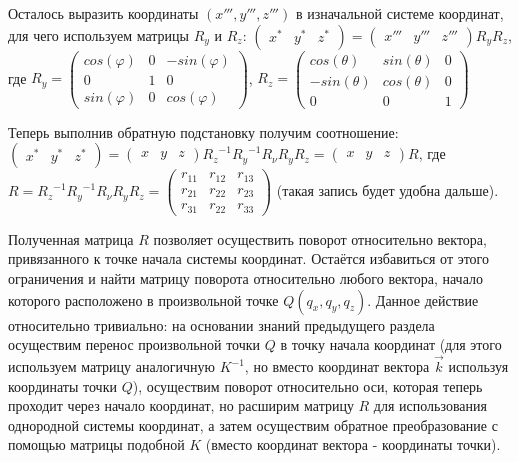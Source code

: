 \documentclass [12pt, a4paper] {article}
\begin{document}
Осталось выразить координаты $(x''', y''', z''')$ в изначальной системе координат, для чего используем матрицы $R_y$ и $R_z$:
$\begin {pmatrix} x^* & y^* & z^* \end {pmatrix} = \begin {pmatrix} x''' & y''' & z''' \end {pmatrix} R_y R_z$, где $R_y = \begin {pmatrix}
	cos(\varphi) & 0 & -sin(\varphi) \\
	0 & 1 & 0 \\
	sin(\varphi) & 0 & cos(\varphi)
\end {pmatrix}$, $R_z = \begin {pmatrix}
	cos(\theta) & sin(\theta) & 0 \\
	-sin(\theta) & cos(\theta) & 0 \\
	0 & 0 & 1
\end {pmatrix}$

Теперь выполнив обратную подстановку получим соотношение:
$\begin {pmatrix} x^* & y^* & z^* \end {pmatrix} = \begin {pmatrix} x & y & z \end {pmatrix} {R_z}^{-1} {R_y}^{-1} R_\nu R_y R_z = \begin {pmatrix} x & y & z\end {pmatrix} R$, где $R = {R_z}^{-1} {R_y}^{-1} R_\nu R_y R_z = \begin {pmatrix}
	r_{11} & r_{12} & r_{13} \\
	r_{21} & r_{22} & r_{23} \\
	r_{31} & r_{22} & r_{33}
\end {pmatrix}$ (такая запись будет удобна дальше).

Полученная матрица $R$ позволяет осуществить поворот относительно вектора, привязанного к точке начала системы координат. Остаётся избавиться от этого ограничения и найти матрицу поворота относительно любого вектора, начало которого расположено в произвольной точке $Q(q_x, q_y, q_z)$.
Данное действие относительно тривиально: на основании знаний предыдущего раздела осуществим перенос произвольной точки $Q$ в точку начала координат (для этого используем матрицу аналогичную $K^{-1}$, но вместо координат вектора $\overrightarrow{k}$ используя координаты точки $Q$), осуществим поворот относительно оси, которая теперь проходит через начало координат, но расширим матрицу $R$ для использования однородной системы координат, а затем осуществим обратное преобразование с помощью матрицы подобной $K$ (вместо координат вектора - координаты точки).
\end{document}
